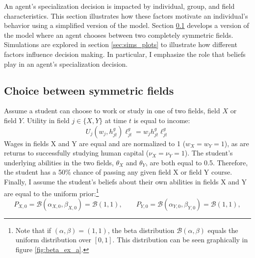 An agent's specialization decision is impacted by individual, group, and field characteristics.
This section illustrates how these factors motivate an individual's behavior using a simplified version of the model.
Section \ref{sec:sims_prelims} develops a version of the model where an agent chooses between two completely symmetric fields. 
Simulations are explored in section \ref{sec:sims_plots} to illustrate how different factors influence decision making.
In particular, I emphasize the role that beliefs play in an agent's specialization decision. 

\subsection{Choice between symmetric fields}\label{sec:sims_prelims}


Assume a student can choose to work or study in one of two fields, field $X$ or field $Y$. 
Utility in field $j \in \{X, Y\}$ at time $t$ is equal to income: 
\begin{equation}\label{eq:linear_utility}
    U_j(w_j, h_{jt}^g) \ell_{jt}^g = w_j h_{jt}^g \ell_{jt}^g
\end{equation}
Wages in fields X and Y are equal and are normalized to 1 ($w_X = w_Y = 1$), as are returns to successfully studying human capital ($\nu_X = \nu_Y = 1$).
The student's underlying abilities in the two fields, $\theta_X$ and $\theta_Y$, are both equal to 0.5. Therefore, the student has a 50\% chance of passing any given field X or field Y course.
Finally, I assume the student's beliefs about their own abilities in fields X and Y are equal to the uniform prior:\footnote{
    Note that if $(\alpha, \beta) = (1, 1)$, the beta distribution $\mathcal{B} (\alpha, \beta)$ equals the uniform distribution over $[0, 1]$. This distribution can be seen graphically in figure \ref{fig:beta_ex_a}.
}
\begin{equation*}
    P_{X,0} = \mathcal{B}(\alpha_{X, 0}, \beta_{X, 0}) = \mathcal{B} (1, 1), 
    \quad \quad 
    P_{Y,0} = \mathcal{B}(\alpha_{Y, 0}, \beta_{Y, 0}) = \mathcal{B} (1, 1), 
\end{equation*}

